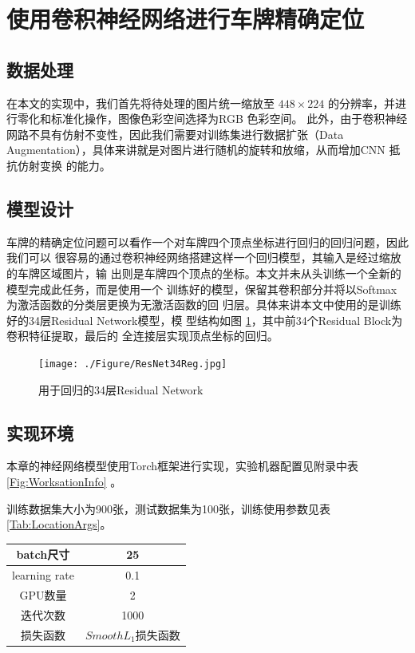 \section{使用卷积神经网络进行车牌精确定位}

\subsection{数据处理}

在本文的实现中，我们首先将待处理的图片统一缩放至 $448 \times 224$ 的分辨率，并进
行零化和标准化操作，图像色彩空间选择为RGB 色彩空间。
此外，由于卷积神经网路不具有仿射不变性，因此我们需要对训练集进行数据扩张（Data
Augmentation），具体来讲就是对图片进行随机的旋转和放缩，从而增加CNN 抵抗仿射变换
的能力。

\subsection{模型设计}

车牌的精确定位问题可以看作一个对车牌四个顶点坐标进行回归的回归问题，因此我们可以
很容易的通过卷积神经网络搭建这样一个回归模型，其输入是经过缩放的车牌区域图片，输
出则是车牌四个顶点的坐标。本文并未从头训练一个全新的模型完成此任务，而是使用一个
训练好的模型，保留其卷积部分并将以Softmax 为激活函数的分类层更换为无激活函数的回
归层。具体来讲本文中使用的是训练好的34层Residual Network\cite{He:2015tt}模型，模
型结构如图 \ref{Fig:ResNet34Reg}，其中前34个Residual Block为卷积特征提取，最后的
全连接层实现顶点坐标的回归。

\begin{figure}[ht]
  \centering
  \texttt{[image: ./Figure/ResNet34Reg.jpg]}
  \caption{用于回归的34层Residual Network}\label{Fig:ResNet34Reg}
\end{figure}

\subsection{实现环境}

本章的神经网络模型使用Torch框架进行实现，实验机器配置见附录中表
\ref{Fig:WorksationInfo} 。

训练数据集大小为900张，测试数据集为100张，训练使用参数见表 \ref{Tab:LocationArgs}。

\begin{tabular}{|c|c|}
\caption{车牌精确定位网络参数}\label{Tab:LocationArgs}
\centering
\hline
batch尺寸 & 25 \\
\hline
learning rate & 0.1 \\
\hline
GPU数量 & 2 \\
\hline
迭代次数 & 1000 \\
\hline
损失函数 & $Smooth L_1$损失函数 \\
\hline
\end{tabular}


